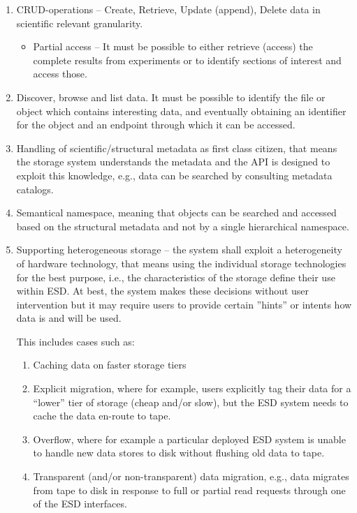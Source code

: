 \begin{enumerate}
\item CRUD-operations -- Create, Retrieve, Update (append), Delete data in scientific relevant granularity.
\begin{itemize}
\item Partial access --
It must be possible to either retrieve (access) the complete results from experiments or to identify sections of interest and access those.
\end{itemize}
\item Discover, browse and list data. It must be possible to identify the file or object which contains interesting data,  and  eventually obtaining an identifier for the object and an endpoint through which it can be accessed.

\item Handling of scientific/structural metadata as first class citizen, that means the storage system understands the metadata and the API is designed to exploit this knowledge, e.g., data can be searched by consulting metadata catalogs.
\item Semantical namespace,  meaning that objects can be searched and accessed based on the structural metadata and not by a single hierarchical namespace.
\item Supporting heterogeneous storage -- the system shall exploit a heterogeneity of hardware technology, that means using the individual storage technologies for the best purpose, i.e., the characteristics of the storage define their use within ESD. At best, the system makes these decisions without user intervention but it may require users to provide certain ”hints” or intents how data is and will be used.

This includes cases such as:
\begin{enumerate}
    \item Caching data on faster storage tiers
    \item Explicit migration, where for example, users explicitly tag their data for a ``lower'' tier of storage (cheap and/or slow), but the ESD system needs to cache the data en-route to tape.
    \item Overflow, where for example a particular deployed ESD system is unable to handle new data stores to disk without flushing old data to tape.
    \item Transparent (and/or non-transparent) data migration, e.g., data migrates from tape to disk in response to full or partial read requests through one of the ESD interfaces.
\end {enumerate}



\end{enumerate}
